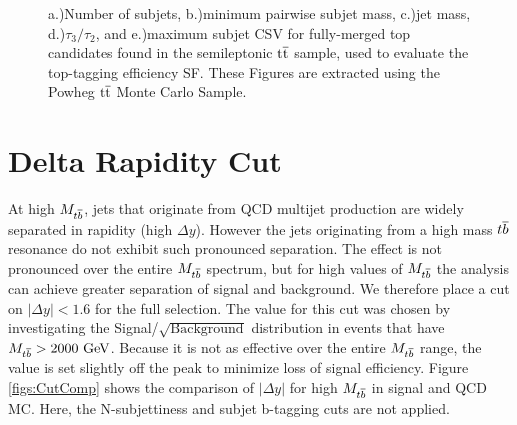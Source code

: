 \begin{figure}
\begin{center}
\end{center}
\caption{ a.)Number of subjets, b.)minimum pairwise subjet mass, c.)jet mass, d.)$\tau_{3}/\tau_{2}$, and  e.)maximum subjet CSV for fully-merged top candidates
  found in the semileptonic $\mathrm{t\overline{t}}$ sample, used to evaluate the top-tagging efficiency SF.  These Figures are extracted using the Powheg $\mathrm{t\overline{t}}$ Monte Carlo Sample. }%
\label{figs:type1_topmasspowheg}
\end{figure}

\section{Delta Rapidity Cut}
\label{sec:deltarapidity}
At high $M_{{t\overline{b}}}$, jets that originate from QCD multijet production are widely separated in rapidity (high $\Delta y$).
However the jets originating from a high mass ${t\overline{b}}$ resonance do not exhibit such pronounced separation.  The effect is not pronounced over the entire 
$M_{{t\overline{b}}}$ spectrum, but for high values of $M_{{t\overline{b}}}$ the analysis can achieve greater separation of signal and background.  We therefore place a cut on $|\Delta y| < 1.6$ 
for the full selection.  The value for this cut was chosen by investigating the Signal/$\sqrt{\text{Background}}$ distribution in events that have $M_{{t\overline{b}}}>2000~\mathrm{GeV}$.  
Because it is not as effective over the entire $M_{{t\overline{b}}}$ range, the value is set slightly off the peak to minimize loss of signal efficiency.
Figure \ref{figs:CutComp} shows the comparison of $|\Delta y|$ for high $M_{{t\overline{b}}}$ in signal and QCD MC.  
Here, the N-subjettiness and subjet b-tagging cuts are not applied.

